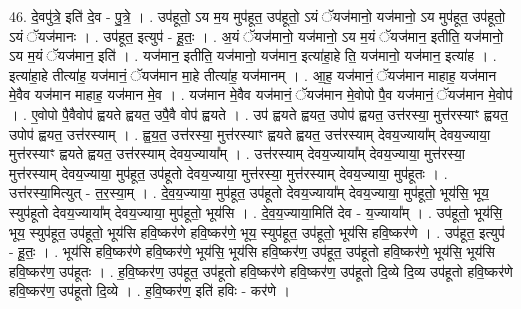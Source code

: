 \documentclass[17pt]{extarticle}
\begin{document}
46. दे॒वपु॑त्रे॒ इति॑ दे॒व - पु॒त्रे॒ । . उप॑हूतो॒ ऽय म॒य मुप॑हूत॒ उप॑हूतो॒ ऽयं ॅयज॑मानो॒ यज॑मानो॒ ऽय मुप॑हूत॒ उप॑हूतो॒ ऽयं ॅयज॑मानः । . उप॑हूत॒ इत्युप॑ - हू॒तः॒ । . अ॒यं ॅयज॑मानो॒ यज॑मानो॒ ऽय म॒यं ॅयज॑मान॒ इतीति॒ यज॑मानो॒ ऽय म॒यं ॅयज॑मान॒ इति॑ । . यज॑मान॒ इतीति॒ यज॑मानो॒ यज॑मान॒ इत्या॑हा॒हे ति॒ यज॑मानो॒ यज॑मान॒ इत्या॑ह । . इत्या॑हा॒हे तीत्या॑ह॒ यज॑मानं॒ ॅयज॑मान मा॒हे तीत्या॑ह॒ यज॑मानम् । . आ॒ह॒ यज॑मानं॒ ॅयज॑मान माहाह॒ यज॑मान मे॒वैव यज॑मान माहाह॒ यज॑मान मे॒व । . यज॑मान मे॒वैव यज॑मानं॒ ॅयज॑मान मे॒वोपो पै॒व यज॑मानं॒ ॅयज॑मान मे॒वोप॑ । . ए॒वोपो पै॒वैवोप॑ ह्वयते ह्वयत॒ उपै॒वै वोप॑ ह्वयते । . उप॑ ह्वयते ह्वयत॒ उपोप॑ ह्वयत॒ उत्त॑रस्या॒ मुत्त॑रस्याꣳ ह्वयत॒ उपोप॑ ह्वयत॒ उत्त॑रस्याम् । . ह्व॒य॒त॒ उत्त॑रस्या॒ मुत्त॑रस्याꣳ ह्वयते ह्वयत॒ उत्त॑रस्याम् देवय॒ज्याया᳚म् देवय॒ज्याया॒ मुत्त॑रस्याꣳ ह्वयते ह्वयत॒ उत्त॑रस्याम् देवय॒ज्याया᳚म् । . उत्त॑रस्याम् देवय॒ज्याया᳚म् देवय॒ज्याया॒ मुत्त॑रस्या॒ मुत्त॑रस्याम् देवय॒ज्याया॒ मुप॑हूत॒ उप॑हूतो देवय॒ज्याया॒ मुत्त॑रस्या॒ मुत्त॑रस्याम् देवय॒ज्याया॒ मुप॑हूतः । . उत्त॑रस्या॒मित्युत् - त॒र॒स्या॒म् । . दे॒व॒य॒ज्याया॒ मुप॑हूत॒ उप॑हूतो देवय॒ज्याया᳚म् देवय॒ज्याया॒ मुप॑हूतो॒ भूय॑सि॒ भूय॒ स्युप॑हूतो देवय॒ज्याया᳚म् देवय॒ज्याया॒ मुप॑हूतो॒ भूय॑सि । . दे॒व॒य॒ज्याया॒मिति॑ देव - य॒ज्याया᳚म् । . उप॑हूतो॒ भूय॑सि॒ भूय॒ स्युप॑हूत॒ उप॑हूतो॒ भूय॑सि हवि॒ष्कर॑णे हवि॒ष्कर॑णे॒ भूय॒ स्युप॑हूत॒ उप॑हूतो॒ भूय॑सि हवि॒ष्कर॑णे । . उप॑हूत॒ इत्युप॑ - हू॒तः॒ । . भूय॑सि हवि॒ष्कर॑णे हवि॒ष्कर॑णे॒ भूय॑सि॒ भूय॑सि हवि॒ष्कर॑ण॒ उप॑हूत॒ उप॑हूतो हवि॒ष्कर॑णे॒ भूय॑सि॒ भूय॑सि हवि॒ष्कर॑ण॒ उप॑हूतः । . ह॒वि॒ष्कर॑ण॒ उप॑हूत॒ उप॑हूतो हवि॒ष्कर॑णे हवि॒ष्कर॑ण॒ उप॑हूतो दि॒व्ये दि॒व्य उप॑हूतो हवि॒ष्कर॑णे हवि॒ष्कर॑ण॒ उप॑हूतो दि॒व्ये । . ह॒वि॒ष्कर॑ण॒ इति॑ हविः - कर॑णे । \newline
\end{document}
